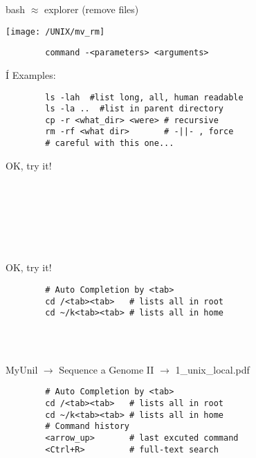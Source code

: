 \documentclass[xcolor=dvipsnames]{beamer}
\begin{document}
\begin{frame}
	bash $\approx$ explorer (remove files)
	\begin{center}
		\texttt{[image: /UNIX/mv\_rm]}
	\end{center}
\end{frame}

\begin{frame}[fragile]
	\begin{verbatim}
		command -<parameters> <arguments>
	\end{verbatim}Í
	Examples:
	\begin{verbatim}
		ls -lah  #list long, all, human readable
		ls -la ..  #list in parent directory
		cp -r <what_dir> <were> # recursive
		rm -rf <what dir>       # -||- , force
		# careful with this one...
	\end{verbatim}
\end{frame}

\begin{frame}[fragile]
	\Huge
	\begin{center}
		OK, try it!	
	\end{center}
	\Large
	\begin{verbatim}
		
		
		
		
		
		
	\end{verbatim}
\end{frame}

\begin{frame}[fragile]
	\Huge
	\begin{center}
		OK, try it!	
	\end{center}
	\Large
	\begin{verbatim}
		# Auto Completion by <tab>
		cd /<tab><tab>   # lists all in root
		cd ~/k<tab><tab> # lists all in home
		
		
		
	\end{verbatim}
\end{frame}

\begin{frame}[fragile]
	\begin{center}
		MyUnil $\rightarrow$ Sequence a Genome II $\rightarrow$ 1\_unix\_local.pdf
	\end{center}
	\Large
	\begin{verbatim}
		# Auto Completion by <tab>
		cd /<tab><tab>   # lists all in root
		cd ~/k<tab><tab> # lists all in home
		# Command history
		<arrow_up>       # last excuted command
		<Ctrl+R>         # full-text search
	\end{verbatim}
\end{frame}
\end{document}
